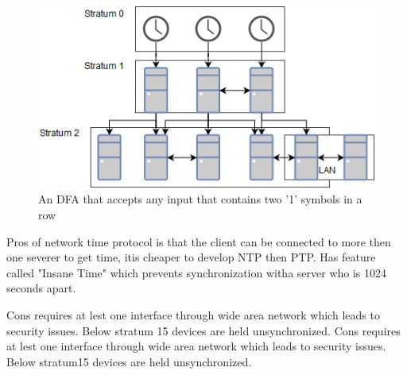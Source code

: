 \begin{figure}[h!]\label{}
	\centering
	\includegraphics[scale=0.4]{synchronization/fig/NTP.png}
	\caption{An DFA that accepts any input that contains two '1' symbols in a row}
	\label{fig:NTP}
\end{figure}
Pros of network time protocol is that the client can be connected to more then one severer to get time, itis cheaper to develop NTP then PTP. Has feature called "Insane Time" which prevents synchronization witha server who is 1024 seconds apart.


Cons requires at lest one interface through wide area network which leads to security issues. Below stratum
15 devices are held unsynchronized.
Cons requires at lest one interface through wide area network which leads to security issues. Below stratum15 devices are held unsynchronized.